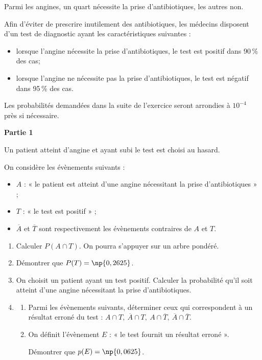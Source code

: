 \medskip

Parmi les angines, un quart nécessite la prise d'antibiotiques, les autres non.

Afin d'éviter de prescrire inutilement des antibiotiques, les médecins disposent d'un test de diagnostic ayant les caractéristiques suivantes :

\begin{itemize}
\item[$\bullet~~$]lorsque l'angine nécessite la prise d'antibiotiques, le test est positif dans 90\,\% des cas;
\item[$\bullet~~$]lorsque l'angine ne nécessite pas la prise d'antibiotiques, le test est négatif dans 95\,\% des cas.
\end{itemize}

\medskip

Les probabilités demandées dans la suite de l'exercice seront arrondies à $10^{-4}$ près si nécessaire.

\bigskip

\textbf{Partie 1}

\medskip

Un patient atteint d'angine et ayant subi le test est choisi au hasard. 

On considère les évènements suivants :

\begin{itemize}
\item[$\bullet~~$]$A$ : « le patient est atteint d'une angine nécessitant la prise d'antibiotiques »{} ; 
\item[$\bullet~~$]$T$ : « le test est positif »{} ;
\item[$\bullet~~$]$\overline{A}$ et $\overline{T}$ sont respectivement les évènements contraires de $A$ et $T$.
\end{itemize}

\medskip

\begin{enumerate}
\item Calculer $P(A \cap T)$. On pourra s'appuyer sur un arbre pondéré.
\item Démontrer que $P(T) = \np{0,2625}$.
\item On choisit un patient ayant un test positif. Calculer la probabilité qu'il soit atteint d'une angine nécessitant la prise d'antibiotiques.
\item
	\begin{enumerate}
		\item Parmi les évènements suivants, déterminer ceux qui correspondent à un résultat erroné du test :  $A \cap T,\: \overline{A} \cap T,\:A \cap \overline{T},\: \overline{A} \cap \overline{T}$.
		\item On définit l'évènement $E$ : « le test fournit un résultat erroné ». 
		
Démontrer que $p(E) = \np{0,0625}$.
	\end{enumerate}
\end{enumerate}

